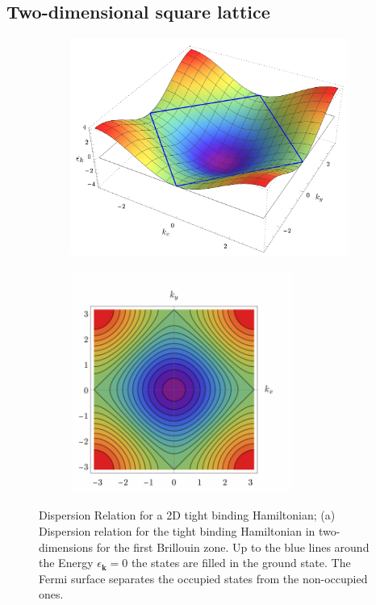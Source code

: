 \documentclass[11pt, a4paper, oneside]{book}
\theoremstyle{definition} %
\begin{document}
\subsection{Two-dimensional square lattice}
	\begin{figure}
		\centering
		\begin{subfigure}[t]{0.49\textwidth}
		\centering
			\includegraphics[width =\textwidth]{Dispersion_relation2d}
			\caption{}
		\end{subfigure}
		\begin{subfigure}[t]{0.49\textwidth}
		\centering
			\includegraphics[width =0.8\textwidth]{Dispersion_Relation2d_Top}
			\caption{}
		\end{subfigure}
		\caption{Dispersion Relation for a 2D tight binding Hamiltonian; (a) Dispersion relation for the tight binding Hamiltonian in two-dimensions for the first Brillouin zone. Up to the blue lines around the Energy $\epsilon_{\mathbf{k}} = 0$ the states are filled in the ground state. The Fermi surface separates the occupied states from the non-occupied ones.}
	\end{figure}
\end{document}
